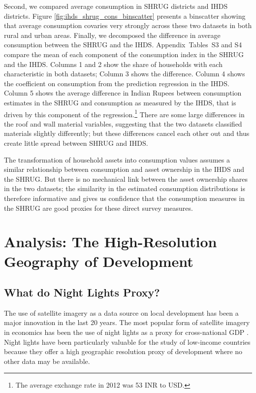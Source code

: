 \documentclass[12pt,letterpaper]{article}
\begin{document}
Second, we compared average consumption in SHRUG districts and IHDS
districts. Figure \ref{fig:ihds_shrug_cons_binscatter} presents a
binscatter showing that average consumption covaries very strongly
across these two datasets in both rural and urban areas. Finally, we
decomposed the difference in average consumption between the SHRUG and
the IHDS. Appendix~Tables~S3 and S4 compare the mean of each component of the
consumption index in the SHRUG and the IHDS. Columns 1 and 2 show the
share of households with each characteristic in both datasets; Column
3 shows the difference. Column 4 shows the coefficient on consumption
from the prediction regression in the IHDS. Column 5 shows the average
difference in Indian Rupees between consumption estimates in the SHRUG
and consumption as measured by the IHDS, that is driven by this
component of the regression.\footnote{The average exchange rate in
  2012 was 53 INR to USD.}  There are some large differences in the
roof and wall material variables, suggesting that the two datasets
classified materials slightly differently; but these differences
cancel each other out and thus create little spread between SHRUG and
IHDS.

The transformation of household assets into consumption values assumes
a similar relationship between consumption and asset ownership in the
IHDS and the SHRUG. But there is no mechanical link between the asset
ownership shares in the two datasets; the similarity in the estimated
consumption distributions is therefore informative and gives us
confidence that the consumption measures in the SHRUG are good proxies
for these direct survey measures.

\section{Analysis: The High-Resolution Geography of Development}
\label{sec:results}

\subsection*{What do Night Lights Proxy?}
\label{sec:nlproxy}

The use of satellite imagery as a data source on local development has
been a major innovation in the last 20 years. The most popular form of
satellite imagery in economics has been the use of night lights as a
proxy for cross-national GDP \cite{henderson2009b}. Night lights have
been particularly valuable for the study of low-income countries
because they offer a high geographic resolution proxy of development
where no other data may be available.
  
\end{document}
